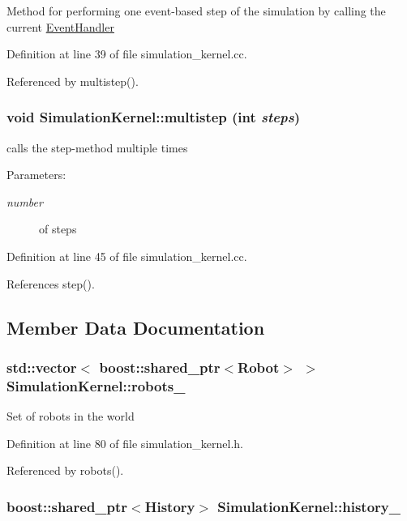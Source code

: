 Method for performing one event-based step of the simulation by calling the current \hyperlink{class_event_handler}{EventHandler} 

Definition at line 39 of file simulation\_\-kernel.cc.

Referenced by multistep().\hypertarget{class_simulation_kernel_77c22f17fdbea282e373bb1a0e373918}{
\subsubsection[multistep]{\setlength{\rightskip}{0pt plus 5cm}void SimulationKernel::multistep (int {\em steps})}}
\label{class_simulation_kernel_77c22f17fdbea282e373bb1a0e373918}


calls the step-method multiple times \begin{Desc}
\item[Parameters:]
\begin{description}
\item[{\em number}]of steps \end{description}
\end{Desc}


Definition at line 45 of file simulation\_\-kernel.cc.

References step().

\subsection{Member Data Documentation}
\hypertarget{class_simulation_kernel_3f66cf6d56a17d864955a771086292ea}{
\subsubsection[robots\_\-]{\setlength{\rightskip}{0pt plus 5cm}std::vector$<$ boost::shared\_\-ptr$<$Robot$>$ $>$ {\bf SimulationKernel::robots\_\-}}}
\label{class_simulation_kernel_3f66cf6d56a17d864955a771086292ea}


Set of robots in the world 

Definition at line 80 of file simulation\_\-kernel.h.

Referenced by robots().\hypertarget{class_simulation_kernel_197d4dccd403ae6bd8f636a458c8b58d}{
\subsubsection[history\_\-]{\setlength{\rightskip}{0pt plus 5cm}boost::shared\_\-ptr$<${\bf History}$>$ {\bf SimulationKernel::history\_\-}}}
\label{class_simulation_kernel_197d4dccd403ae6bd8f636a458c8b58d}


